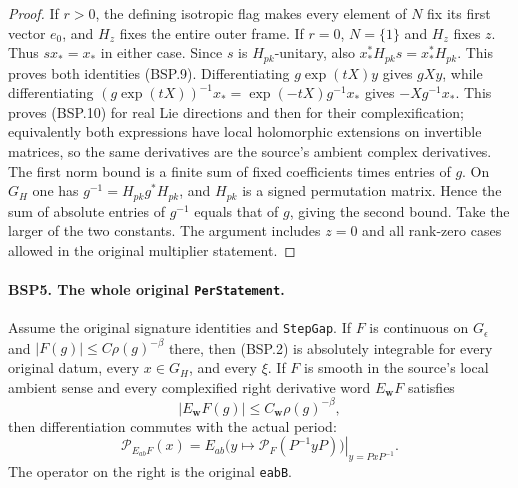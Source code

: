 \documentclass[11pt,a4paper]{article}
\numberwithin{equation}{section}
\theoremstyle{remark}\newtheorem{remark}[theorem]{Remark}
\begin{document}
\begin{proof}
If $r>0$, the defining isotropic flag makes every element of $N$ fix
its first vector $e_0$, and $H_z$ fixes the entire outer frame.
If $r=0$, $N=\{1\}$ and $H_z$ fixes $z$.  Thus $sx_*=x_*$ in either
case.  Since $s$ is $H_{pk}$-unitary, also
$x_*^*H_{pk}s=x_*^*H_{pk}$.  This proves both identities (BSP.9).
Differentiating $g\exp(tX)y$ gives $gXy$, while differentiating
$(g\exp(tX))^{-1}x_*=\exp(-tX)g^{-1}x_*$ gives
$-Xg^{-1}x_*$.  This proves (BSP.10) for real Lie directions and then
for their complexification; equivalently both expressions have local
holomorphic extensions on invertible matrices, so the same derivatives
are the source's ambient complex derivatives.
The first norm bound is a finite sum of fixed coefficients times entries
of $g$.  On $G_H$ one has $g^{-1}=H_{pk}g^*H_{pk}$, and $H_{pk}$ is
a signed permutation matrix.  Hence the sum of absolute entries of
$g^{-1}$ equals that of $g$, giving the second bound.  Take the larger
of the two constants.  The argument includes $z=0$ and all rank-zero
cases allowed in the original multiplier statement.
\end{proof}

\paragraph{BSP5. The whole original \texttt{Per\allowbreak Statement}.}
\label{claim:BSP5}
Assume the original signature identities and \texttt{Step\allowbreak Gap}.
If $F$ is continuous on $G_\epsilon$ and
$|F(g)|\le C\rho(g)^{-\beta}$ there, then (BSP.2) is absolutely
integrable for every original datum, every $x\in G_H$, and every $\xi$.
If $F$ is smooth in the source's local ambient sense and every
complexified right derivative word $E_{\mathbf w}F$ satisfies
\[
 |E_{\mathbf w}F(g)|\le C_{\mathbf w}\rho(g)^{-\beta},
 \tag{BSP.11}
\]
then differentiation commutes with the actual period:
\[
 \mathcal P_{E_{ab}F}(x)
    =\left.
       E_{ab}\bigl(y\longmapsto\mathcal P_F(P^{-1}yP)\bigr)
      \right|_{y=PxP^{-1}}.
 \tag{BSP.12}
\]
The operator on the right is the original \texttt{eab\allowbreak B}.
\end{document}
